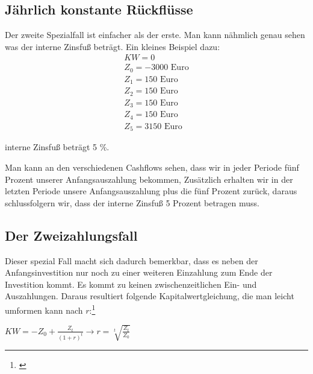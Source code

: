 \subsection{Jährlich konstante Rückflüsse}
Der zweite Spezialfall ist einfacher als der erste. Man kann nähmlich genau sehen was der interne Zinsfuß beträgt. Ein kleines Beispiel dazu:
\begin{align*}
    KW = 0                   \\
    Z_0 = -3000 \text{ Euro} \\
    Z_1 = 150 \text{ Euro}   \\
    Z_2 = 150 \text{ Euro}   \\
    Z_3 = 150 \text{ Euro}   \\
    Z_4 = 150 \text{ Euro}   \\
    Z_5 = 3150 \text{ Euro}
\end{align*}
\begin{center}
    interne Zinsfuß beträgt 5 \%.
\end{center}
Man kann an den verschiedenen Cashflows sehen, dass wir in jeder Periode fünf Prozent unserer Anfangsauszahlung bekommen, Zusätzlich erhalten wir in der letzten Periode unsere Anfangsauszahlung plus die fünf Prozent zurück, daraus schlussfolgern wir, dass der interne Zinsfuß 5 Prozent betragen muss.
\subsection{Der Zweizahlungsfall}
Dieser spezial Fall macht sich dadurch bemerkbar, dass es neben der Anfangsinvestition nur noch zu einer weiteren Einzahlung zum Ende der Investition kommt. Es kommt zu keinen zwischenzeitlichen Ein- und Auszahlungen. Daraus resultiert folgende Kapitalwertgleichung, die man leicht umformen kann nach $r$:\footnote{\cite{lex-interner-zinsfuss}}\\
\begin{center}
    $ KW = -Z_{0} + \frac{Z_{t}}{(1+r)^{t}} \rightarrow r = \sqrt[t]{\frac{Z_t}{Z_0}} $
\end{center}
